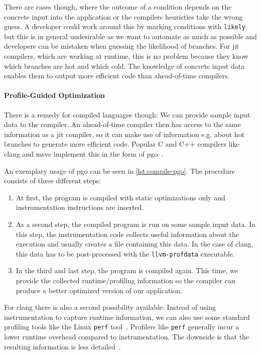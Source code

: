 There are cases though, where the outcome of a condition depends on the concrete input into the application or the compilers heuristics take the wrong guess. A developer could work around this by marking conditions with \texttt{likely} but this is in general undesirable as we want to automate as much as possible and developers can be mistaken when guessing the likelihood of branches. For \gls{jit} compilers, which are working at runtime, this is no problem because they know which branches are hot and which cold. The knowledge of concrete input data enables them to output more efficient code than ahead-of-time compilers.

\paragraph{Profile-Guided Optimization} There is a remedy for compiled languages though: We can provide sample input data to the compiler. An ahead-of-time compiler then has access to the same information as a \gls{jit} compiler, so it can make use of information e.g. about hot branches to generate more efficient code. Popular C and C++ compilers like clang and msvc implement this in the form of \gls{pgo}~\cite{ClangManual, MicrosoftPgo}.

An exemplary usage of \gls{pgo} can be seen in \cref{lst:compile-pgo}. The procedure consists of three different steps:
\begin{enumerate}
	\item At first, the program is compiled with static optimizations only and instrumentation instructions are inserted.
	\item As a second step, the compiled program is run on some sample input data. In this step, the instrumentation code collects useful information about the execution and usually creates a file containing this data. In the case of clang, this data has to be post-processed with the \texttt{llvm-profdata} executable.
	\item In the third and last step, the program is compiled again. This time, we provide the collected runtime/profiling information so the compiler can produce a better optimized version of our application.
\end{enumerate}



For clang there is also a second possibility available. Instead of using instrumentation to capture runtime information, we can also use some standard profiling tools like the Linux \texttt{perf} tool~\cite{LinuxPerf}. Profilers like \texttt{perf} generally incur a lower runtime overhead compared to instrumentation. The downside is that the resulting information is less detailed~\cite{ClangManual}.

